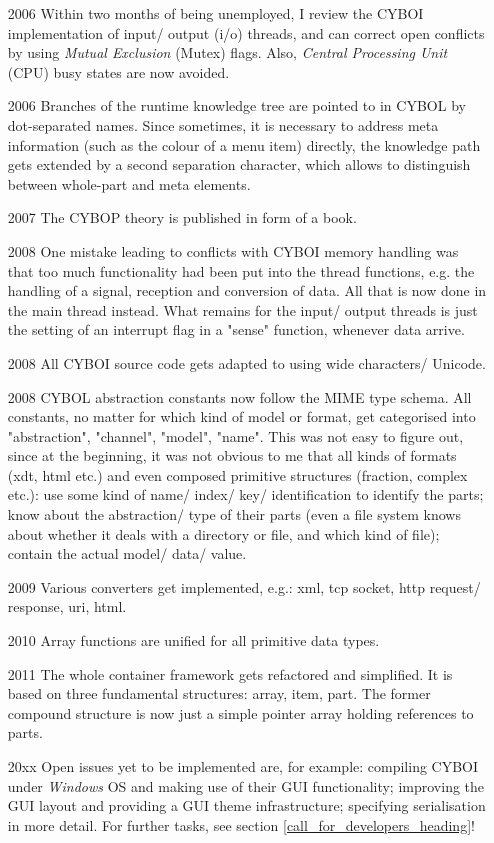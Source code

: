 \begin{itemize}
    \item[2006] Within two months of being unemployed, I review the CYBOI
        implementation of input/ output (i/o) threads, and can correct open
        conflicts by using \emph{Mutual Exclusion} (Mutex) flags.
        Also, \emph{Central Processing Unit} (CPU) busy states are now avoided.
    \item[2006] Branches of the runtime knowledge tree are pointed to in CYBOL
        by dot-separated names. Since sometimes, it is necessary to address meta
        information (such as the colour of a menu item) directly, the knowledge
        path gets extended by a second separation character, which allows to
        distinguish between whole-part and meta elements.
    \item[2007] The CYBOP theory is published in form of a book.
    \item[2008] One mistake leading to conflicts with CYBOI memory handling was
        that too much functionality had been put into the thread functions,
        e.g. the handling of a signal, reception and conversion of data.
        All that is now done in the main thread instead. What remains for the
        input/ output threads is just the setting of an interrupt flag in a
        "sense" function, whenever data arrive.
    \item[2008] All CYBOI source code gets adapted to using wide characters/ Unicode.
    \item[2008] CYBOL abstraction constants now follow the MIME type schema.
        All constants, no matter for which kind of model or format,
        get categorised into "abstraction", "channel", "model", "name".
        This was not easy to figure out, since at the beginning,
        it was not obvious to me that all kinds of formats (xdt, html etc.)
        and even composed primitive structures (fraction, complex etc.):
        use some kind of name/ index/ key/ identification to identify the parts;
        know about the abstraction/ type of their parts (even a file system knows
        about whether it deals with a directory or file, and which kind of file);
        contain the actual model/ data/ value.
    \item[2009] Various converters get implemented, e.g.:
        xml, tcp socket, http request/ response, uri, html.
    \item[2010] Array functions are unified for all primitive data types.
    \item[2011] The whole container framework gets refactored and simplified.
        It is based on three fundamental structures: array, item, part.
        The former compound structure is now just a simple pointer array
        holding references to parts.
    \item[20xx] Open issues yet to be implemented are, for example:
        compiling CYBOI under \emph{Windows} OS and making use of their GUI
        functionality; improving the GUI layout and providing a GUI theme
        infrastructure; specifying serialisation in more detail.
        For further tasks, see section \ref{call_for_developers_heading}!
\end{itemize}
